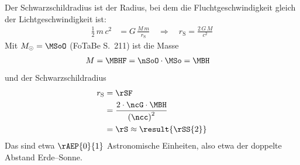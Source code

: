 Der Schwarzschildradius ist der Radius, bei dem die Fluchtgeschwindigkeit gleich der Lichtgeschwindigkeit ist:
\begin{align}
 \frac{1}{2}\,m\,c^2 &= G\,\frac{M\,m}{r_\mathrm{S}}
 \quad\Rightarrow\quad r_\mathrm{S} = \frac{2\,G\,M}{c^2}
\end{align}
Mit $M_\odot = \MSoO$ (FoTaBe S.~211) ist die Masse
\begin{align}
 M &= \MBHF = \nSoO\cdot\MSo = \MBH
\end{align}
und der Schwarzschildradius
\begin{align}
 r_\mathrm{S} &= \rSF \\
   &= \frac{2\cdot\ncG\cdot\MBH}{\left(\ncc\right)^2} \\
   &= \rS \approx \result{\rSS{2}}
\end{align}
Das sind etwa $\rAEP{0}{1}$ Astronomische Einheiten, also etwa der doppelte Abstand Erde--Sonne.
